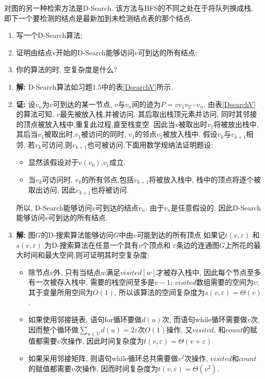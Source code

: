 \begin{problem}[习题2.7]
对图的另一种检索方法是D-Search. 该方法与BFS的不同之处在于将队列换成栈, 即下一个要检测的结点是最新加到未检测结点表的那个结点.
\begin{enumerate}
\item 写一个D-Search算法;
\item 证明由结点v开始的D-Search能够访问$v$可到达的所有结点;
\item 你的算法的时, 空复杂度是什么?
\end{enumerate}
\end{problem}

\begin{solution}
\begin{enumerate}
\item \textbf{解:} D-Search算法如习题1.5中的表\ref{DsearchV}所示.
\item \textbf{证:} 设$v_n$为$v$可到达的某一节点, $v$与$v_n$间的迹为$P = vv_1v_2\cdots v_n$. 由表\ref{DsearchV}的算法可知, $v$最先被放入栈,并被访问. 其后取出栈顶元素并访问, 同时其邻接的顶点被放入栈中,重复此过程,直至栈变空. 因此当$v$被取出时$v_1$将被放出栈中, 其后当$v_1$被取出时,$v_1$被访问的同时, $v_1$的邻点$v_2$被放入栈中. 假设$v_k$与$v_{k+1}$相邻, 若$v_k$可访问,则$v_{k+1}$也可被访问.下面用数学规纳法证明题设:
    \begin{itemize}
    \item 显然该假设对于$v(v_0)$,$v_1$成立.
    \item 当$v_k$可访问时, $v_k$的所有邻点,包括$v_{k+1}$将被放入栈中, 栈中的顶点将逐个被取出访问, 因此$v_{k+1}$也将被访问.
    \end{itemize}
    所以, D-Search能够访问$v$可到达的结点$v_n$. 由于$v_n$是任意假设的, 因此D-Search能够访问$v$可到达的所有结点.
\item \textbf{解:} 图$G$的D-搜索算法能够访问$G$中由$v$可能到达的所有顶点
    如果记$t(v,\varepsilon)$ 和$s(v,\varepsilon)$ 为D-搜索算法在任意一个具有$v$个顶点和
    $\varepsilon$条边的连通图$G$上所花的最大时间和最大空间.则可证明其时空复杂度:
\begin{itemize}
\item 除节点$v$外, 只有当结点$w$满足$visited[w]$才被存入栈中, 因此每个节点至多有一次被存入栈中, 需要的栈空间至多是$v-1$; $visited$数组需要的空间为$v$; 其于变量所用空间为$O(1)$, 所以该算法的空间复杂度为$s(v,\varepsilon) = \Theta(v)$.
\item 如果使用邻接链表, 语句for循环要做$d(u)$次, 而语句while循环需要做$v$次,
    因而整个循环做$\sum_{u\in V}d(u)=2\varepsilon$次$O(1)$操作, 又$visited$, 和$count$的赋值都需要$v$次操作, 因此时间复杂度为$t(v,\varepsilon) = \Theta(v+\varepsilon)$
\item 如果采用邻接矩阵, 则语句while循环总共需要做$v^2$次操作, $visited$和$count$的赋值都需要$v$次操作, 因而时间复杂度为$t(v,\varepsilon) = \Theta(v^2)$.
\end{itemize}
\end{enumerate}
\end{solution}
